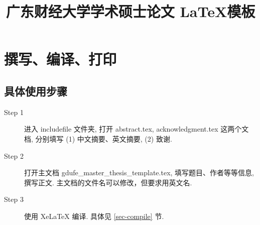 \documentclass[class = professional, oneside]{gdufe_master_thesis}
\begin{document}
\title{广东财经大学学术硕士论文 \LaTeX{}模板}
\pagestyle{empty}

\frontmatter
\tableofcontents

\mainmatter
\chapter{撰写、编译、打印}

\section{具体使用步骤}

\begin{description}

    \item[Step 1]  进入 includefile 文件夹,  打开 abstract.tex, acknowledgment.tex 这两个文档,
          分别填写 (1) 中文摘要、英文摘要, (2) 致谢.

    \item[Step 2]  打开主文档 gdufe\_master\_thesis\_template.tex, 填写题目、作者等等信息, 撰写正文. 主文档的文件名可以修改，但要求用英文名.

    \item[Step 3]  使用 XeLaTeX 编译. 具体见 \ref{sec-compile} 节.

\end{description}
\end{document}
